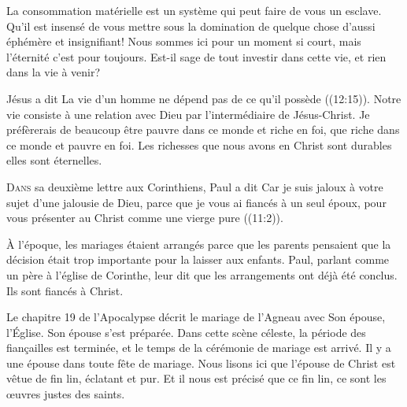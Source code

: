 
La consommation matérielle est un système qui peut faire de vous un esclave.
 Qu'il est insensé de vous mettre sous la domination de quelque chose
 d'aussi éphémère et insignifiant!
 Nous sommes ici pour un moment si court, mais l'éternité c'est pour toujours.
 Est-il sage de tout investir dans cette vie, et rien dans la vie à venir?

Jésus a dit\frcolon{} 
 \Og La vie d'un homme ne dépend pas de ce qu'il possède \Fg{}
 ((12:15)).
 Notre vie consiste à une relation avec Dieu par l'intermédiaire
 de Jésus-Christ. Je préfèrerais de beaucoup être pauvre dans ce monde
 et riche en foi, que riche dans ce monde et pauvre en foi.
 Les richesses que nous avons en Christ sont durables
 \ocadr elles sont éternelles.

\dvrule






\lettrine{D}{ans} sa deuxième lettre aux Corinthiens,
 Paul a dit\frcolon{} 
 \Og Car je suis jaloux à votre sujet d'une jalousie de Dieu,
 parce que je vous ai fiancés à un seul époux,
 pour vous présenter au Christ comme une vierge pure \Fg{}
 ((11:2)). 

À l'époque, les mariages étaient arrangés parce que les parents
 pensaient que la décision était trop importante pour la laisser aux enfants.
 Paul, parlant comme un père à l'église de Corinthe,
 leur dit que les arrangements ont déjà été conclus.
 Ils sont fiancés à Christ. 

Le chapitre 19 de l'Apocalypse décrit le mariage de l'Agneau avec Son épouse,
 l'Église. 
 \Og Son épouse s'est préparée. \Fg{} 
 Dans cette scène céleste, la période des fian\c{c}ailles est terminée,
 et le temps de la cérémonie de mariage est arrivé.
 Il y a une épouse dans toute fête de mariage.
 Nous lisons ici que l'épouse de Christ est \Og vêtue de fin lin,
 éclatant et pur. \Fg{} 
 Et il nous est précisé que ce fin lin, ce sont
 \Og les \oe{}uvres justes des saints. \Fg{}  

